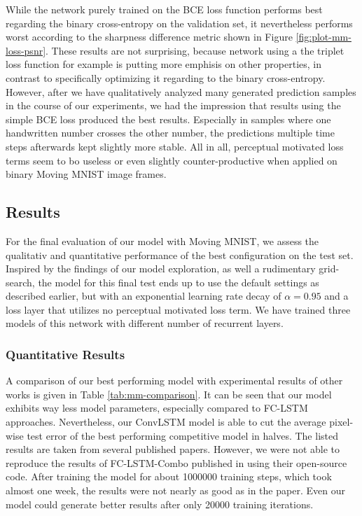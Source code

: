 While the network purely trained on the BCE loss function performs best regarding the binary cross-entropy on the validation set, it nevertheless performs worst according to the sharpness difference metric shown in Figure \ref{fig:plot-mm-loss-psnr}. These results are not surprising, because network using a the triplet loss function for example is putting more emphisis on other properties, in contrast to specifically optimizing it regarding to the binary cross-entropy. However, after we have qualitatively analyzed many generated prediction samples in the course of our experiments, we had the impression that results using the simple BCE loss produced the best results. Especially in samples where one handwritten number crosses the other number, the predictions multiple time steps afterwards kept slightly more stable. All in all, perceptual motivated loss terms seem to bo useless or even slightly counter-productive when applied on binary Moving MNIST image frames. 

\subsection{Results}

For the final evaluation of our model with Moving MNIST, we assess the qualitativ and quantitative performance of the best configuration on the test set. Inspired by the findings of our model exploration, as well a rudimentary grid-search, the model for this final test ends up to use the default settings as described earlier, but with an exponential learning rate decay of $\alpha=0.95$ and a loss layer that utilizes no perceptual motivated loss term. We have trained three models of this network with different number of recurrent layers. 


\subsubsection{Quantitative Results}

A comparison of our best performing model with experimental results of other works is given in Table \ref{tab:mm-comparison}. It can be seen that our model exhibits way less model parameters, especially compared to FC-LSTM approaches. Nevertheless, our ConvLSTM model is able to cut the average pixel-wise test error of the best performing competitive model in halves. The listed results are taken from several published papers. However, we were not able to reproduce the results of FC-LSTM-Combo published in \parencite{unsup_learn_lstm} using their open-source code. After training the model for about \num{1000000} training steps, which took almost one week, the results were not nearly as good as in the paper. Even our model could generate better results after only \num{20000} training iterations.

